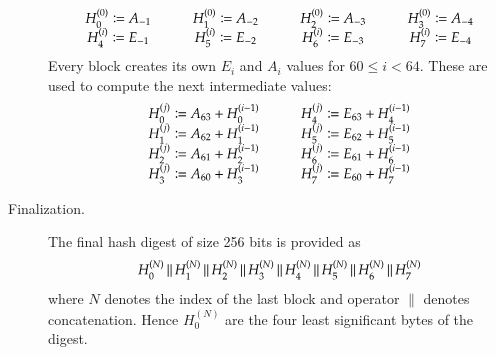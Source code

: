 \begin{description}
    \[
      \begin{array}{cp{10pt}cp{10pt}cp{10pt}c}
        H_0^{(0)} \coloneqq A_{-1}  & &  H_1^{(0)} \coloneqq A_{-2}  & &  H_2^{(0)} \coloneqq A_{-3}  & &  H_3^{(0)} \coloneqq A_{-4} \\
        H_4^{(i)} \coloneqq E_{-1}  & &  H_5^{(i)} \coloneqq E_{-2}  & &  H_6^{(i)} \coloneqq E_{-3}  & &  H_7^{(i)} \coloneqq E_{-4} \\
      \end{array}
    \]
    Every block creates its own $E_{i}$ and $A_{i}$ values for $60 \leq i < 64$.
    These are used to compute the next intermediate values:
    \[
      \begin{array}{lp{10pt}r}
        H_0^{(j)} \coloneqq A_{63} + H_0^{(i-1)}  & &  H_4^{(j)} \coloneqq E_{63} + H_4^{(i-1)} \\
        H_1^{(j)} \coloneqq A_{62} + H_1^{(i-1)}  & &  H_5^{(j)} \coloneqq E_{62} + H_5^{(i-1)} \\
        H_2^{(j)} \coloneqq A_{61} + H_2^{(i-1)}  & &  H_6^{(j)} \coloneqq E_{61} + H_6^{(i-1)} \\
        H_3^{(j)} \coloneqq A_{60} + H_3^{(i-1)}  & &  H_7^{(j)} \coloneqq E_{60} + H_7^{(i-1)}
      \end{array}
    \]
  \item[Finalization.]
    The final hash digest of size 256 bits is provided as
    \[
      H_0^{(N)} \,\|\,
      H_1^{(N)} \,\|\,
      H_2^{(N)} \,\|\,
      H_3^{(N)} \,\|\,
      H_4^{(N)} \,\|\,
      H_5^{(N)} \,\|\,
      H_6^{(N)} \,\|\,
      H_7^{(N)}
    \]
    where $N$ denotes the index of the last block and operator $\|$ denotes
    concatenation. Hence $H_0^{(N)}$ are the four least significant bytes of the digest.
\end{description}
